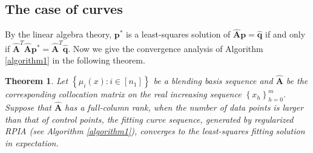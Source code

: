 \documentclass[11pt]{article}
\newtheorem{theorem}{Theorem}[section]
\numberwithin{equation}{section}
\begin{document}
\subsection{The case of curves}
By the linear algebra theory, $\boldsymbol{p}^{*}$ is a least-squares solution of $\hat{\boldsymbol{A}} \boldsymbol{p}=\hat{\boldsymbol{q}}$ if and only if $\hat{\boldsymbol{A}}^{T} \hat{\boldsymbol{A}} \boldsymbol{p}^{*}=\hat{\boldsymbol{A}}^{T} \hat{\boldsymbol{q}}$. Now we give the convergence analysis of Algorithm \ref{algorithm1} in the following theorem.
\begin{theorem}
Let $\left\{\mu_{i}(x): i \in\left[n_{1}\right]\right\}$ be a blending basis sequence and $\hat{\boldsymbol{A}}$ be the corresponding collocation matrix on the real increasing sequence $\left\{x_{h}\right\}_{h=0}^{m}$. Suppose that $\hat{\boldsymbol{A}}$ has a full-column rank, when the number of data points is larger than that of control points, the fitting curve sequence, generated by regularized RPIA (see Algorithm \ref{algorithm1}), converges to the least-squares fitting solution in expectation.
\end{theorem}
\end{document}
